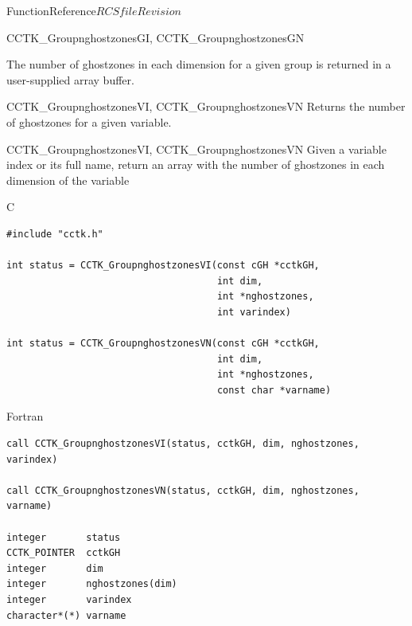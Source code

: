 \begin{cactuspart}{FunctionReference}{$RCSfile$}{$Revision$}
\begin{FunctionDescription}{CCTK\_GroupnghostzonesGI, CCTK\_GroupnghostzonesGN}
\begin{Discussion}
The number of ghostzones in each dimension for a given group is returned in a user-supplied array buffer.
\end{Discussion}

\begin{SeeAlsoSection}
\begin{SeeAlso}{CCTK\_GroupnghostzonesVI, CCTK\_GroupnghostzonesVN}
Returns the number of ghostzones for a given variable.
\end{SeeAlso}
\end{SeeAlsoSection}

\end{FunctionDescription}


\begin{FunctionDescription}{CCTK\_GroupnghostzonesVI, CCTK\_GroupnghostzonesVN}
\label{CCTK-GroupnghostzonesVI}
\label{CCTK-GroupnghostzonesVN}
  Given a variable index or its full name, return an array with the number of ghostzones in each dimension of the variable

\begin{SynopsisSection}
\begin{Synopsis}{C}
\begin{verbatim}
#include "cctk.h"

int status = CCTK_GroupnghostzonesVI(const cGH *cctkGH,
                                     int dim,
                                     int *nghostzones,
                                     int varindex)

int status = CCTK_GroupnghostzonesVN(const cGH *cctkGH,
                                     int dim,
                                     int *nghostzones,
                                     const char *varname)
\end{verbatim}
\end{Synopsis}
\begin{Synopsis}{Fortran}
\begin{verbatim}
call CCTK_GroupnghostzonesVI(status, cctkGH, dim, nghostzones, varindex)

call CCTK_GroupnghostzonesVN(status, cctkGH, dim, nghostzones, varname)

integer       status
CCTK_POINTER  cctkGH
integer       dim
integer       nghostzones(dim)
integer       varindex
character*(*) varname
\end{verbatim}
\end{Synopsis}
\end{SynopsisSection}


\end{FunctionDescription}
\end{cactuspart}
